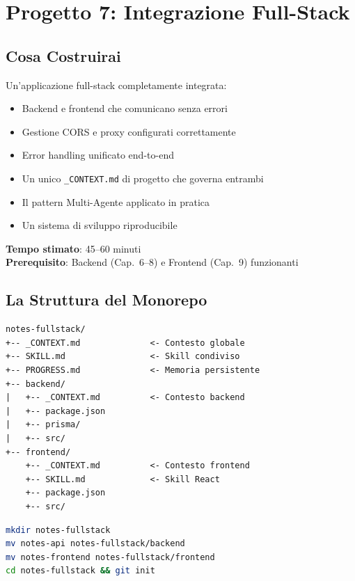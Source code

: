 \chapter{Progetto 7: Integrazione Full-Stack}

\section*{Cosa Costruirai}
Un'applicazione full-stack completamente integrata:
\begin{itemize}
  \item Backend e frontend che comunicano senza errori
  \item Gestione CORS e proxy configurati correttamente
  \item Error handling unificato end-to-end
  \item Un unico \texttt{\_CONTEXT.md} di progetto che governa entrambi
  \item Il pattern Multi-Agente applicato in pratica
  \item Un sistema di sviluppo riproducibile
\end{itemize}

\textbf{Tempo stimato}: 45--60 minuti\\
\textbf{Prerequisito}: Backend (Cap.~6--8) e Frontend (Cap.~9) funzionanti

\section{La Struttura del Monorepo}

\begin{praticabox}[title={Pratica --- Organizzare la workspace}]
\begin{lstlisting}[language={}]
notes-fullstack/
+-- _CONTEXT.md              <- Contesto globale
+-- SKILL.md                 <- Skill condiviso
+-- PROGRESS.md              <- Memoria persistente
+-- backend/
|   +-- _CONTEXT.md          <- Contesto backend
|   +-- package.json
|   +-- prisma/
|   +-- src/
+-- frontend/
    +-- _CONTEXT.md          <- Contesto frontend
    +-- SKILL.md             <- Skill React
    +-- package.json
    +-- src/
\end{lstlisting}
\begin{lstlisting}[language=bash]
mkdir notes-fullstack
mv notes-api notes-fullstack/backend
mv notes-frontend notes-fullstack/frontend
cd notes-fullstack && git init
\end{lstlisting}
\end{praticabox}

